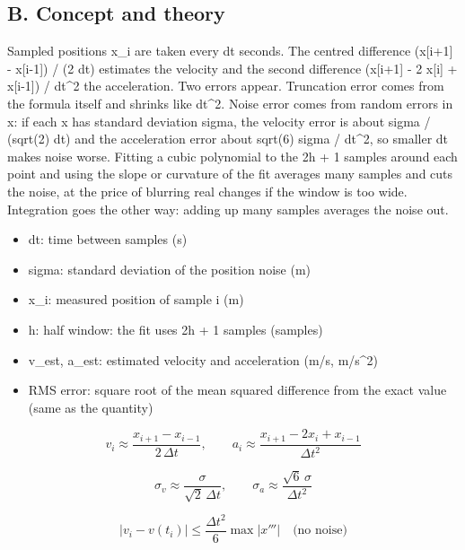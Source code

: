 \documentclass[11pt,a4paper]{article}
\begin{document}
\subsection*{B. Concept and theory}
Sampled positions x\_i are taken every dt seconds. The centred difference (x[i+1] - x[i-1]) / (2 dt) estimates the velocity and the second difference (x[i+1] - 2 x[i] + x[i-1]) / dt\textasciicircum{}2 the acceleration. Two errors appear. Truncation error comes from the formula itself and shrinks like dt\textasciicircum{}2. Noise error comes from random errors in x: if each x has standard deviation sigma, the velocity error is about sigma / (sqrt(2) dt) and the acceleration error about sqrt(6) sigma / dt\textasciicircum{}2, so smaller dt makes noise worse. Fitting a cubic polynomial to the 2h + 1 samples around each point and using the slope or curvature of the fit averages many samples and cuts the noise, at the price of blurring real changes if the window is too wide. Integration goes the other way: adding up many samples averages the noise out.

\begin{itemize}[nosep]
\item dt: time between samples (s)
\item sigma: standard deviation of the position noise (m)
\item x\_i: measured position of sample i (m)
\item h: half window: the fit uses 2h + 1 samples (samples)
\item v\_est, a\_est: estimated velocity and acceleration (m/s, m/s\textasciicircum{}2)
\item RMS error: square root of the mean squared difference from the exact value (same as the quantity)
\end{itemize}

\begin{equation*}
v_i\approx\frac{x_{i+1}-x_{i-1}}{2\,\Delta t},\qquad a_i\approx\frac{x_{i+1}-2x_i+x_{i-1}}{\Delta t^2}
\end{equation*}

\begin{equation*}
\sigma_v\approx\frac{\sigma}{\sqrt2\,\Delta t},\qquad \sigma_a\approx\frac{\sqrt6\,\sigma}{\Delta t^2}
\end{equation*}

\begin{equation*}
\left|v_i-v(t_i)\right|\le\frac{\Delta t^2}{6}\max|x'''|\quad\text{(no noise)}
\end{equation*}
\end{document}
